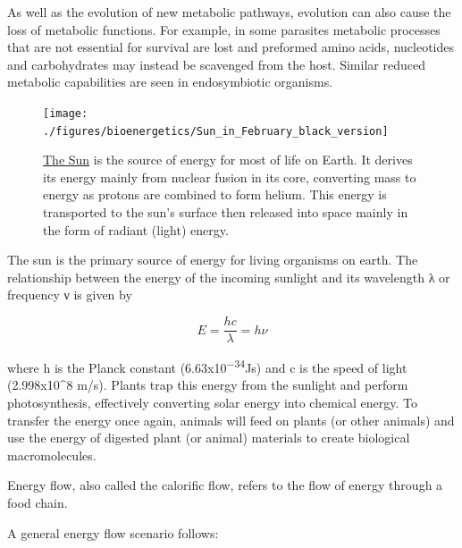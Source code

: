 As well as the evolution of new metabolic pathways, evolution can also cause the loss of metabolic functions. For example, in some parasites metabolic processes that are not essential for survival are lost and preformed amino acids, nucleotides and carbohydrates may instead be scavenged from the host. Similar reduced metabolic capabilities are seen in endosymbiotic organisms.



\begin{figure}

{\centering \texttt{[image: ./figures/bioenergetics/Sun\_in\_February\_black\_version]} 

}

\caption{\href{https://commons.wikimedia.org/wiki/File:Sun_in_February_(black_version).jpg}{The Sun} is the source of energy for most of life on Earth. It derives its energy mainly from nuclear fusion in its core, converting mass to energy as protons are combined to form helium. This energy is transported to the sun's surface then released into space mainly in the form of radiant (light) energy.}\label{fig:energyfromsun}
\end{figure}

The sun is the primary source of energy for living organisms on earth. The relationship between the energy of the incoming sunlight and its wavelength λ or frequency ν is given by

\[ E={\frac  {hc}{\lambda }}=h\nu \]

where h is the Planck constant (6.63x10\textsuperscript{−34}Js) and c is the speed of light (2.998x10\^{}8 m/s). Plants trap this energy from the sunlight and perform photosynthesis, effectively converting solar energy into chemical energy. To transfer the energy once again, animals will feed on plants (or other animals) and use the energy of digested plant (or animal) materials to create biological macromolecules.

Energy flow, also called the calorific flow, refers to the flow of energy through a food chain.

A general energy flow scenario follows:

